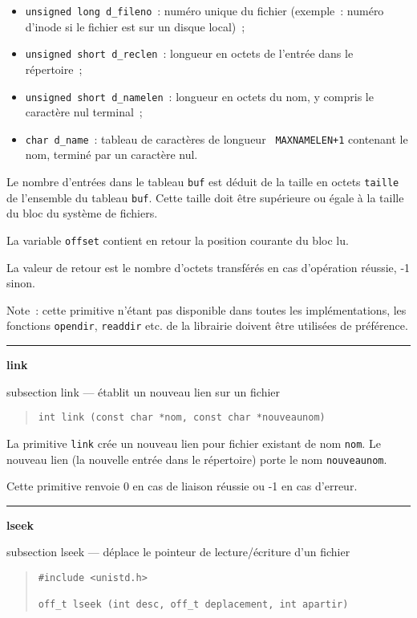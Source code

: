 \documentclass [twoside] {report}
\newcommand {\primitive} [1]
    {
	{\large \bf #1}
	\addcontentsline {toc} {subsection} {#1}
    }
\newcommand {\separation}
    {
	\vspace {7mm}
	\nopagebreak
	\hrule
    }
\begin{document}
\begin {itemize}
    \item {\tt unsigned long d\_fileno}~:  numéro unique du fichier
	(exemple~:  numéro d'inode si le fichier est sur un disque
	local)~;
    \item {\tt unsigned short d\_reclen}~: longueur en octets de l'entrée
	dans le répertoire~;
    \item {\tt unsigned short d\_namelen}~: longueur en octets du nom, y
	compris le caractère nul terminal~;
    \item {\tt char d\_name}~: tableau de caractères de longueur {\tt
	MAXNAMELEN+1} contenant le nom, terminé par un caractère nul.

\end {itemize}

Le nombre d'entrées dans le tableau {\tt buf} est déduit de la taille en
octets {\tt taille} de l'ensemble du tableau {\tt buf}. Cette taille
doit être supérieure ou égale à la taille du bloc du système de
fichiers.

La variable {\tt offset} contient en retour la position courante du bloc
lu.

La valeur de retour est le nombre d'octets transférés en cas d'opération
réussie, -1 sinon.

Note~:  cette primitive n'étant pas disponible dans toutes les
implémentations, les fonctions {\tt opendir}, {\tt readdir} etc.  de la
librairie doivent être utilisées de préférence.


\separation
\primitive {link} --- établit un nouveau lien sur un fichier

\begin {quote}
\begin {verbatim}
int link (const char *nom, const char *nouveaunom)
\end{verbatim}
\end {quote}

La primitive {\tt link} crée un nouveau lien pour
fichier existant de nom {\tt nom}. Le nouveau lien
(la nouvelle entrée dans le répertoire) porte
le nom {\tt nouveaunom}.

Cette primitive renvoie 0 en cas de liaison
réussie ou -1 en cas d'erreur.




\separation
\primitive {lseek} --- déplace le pointeur de lecture/écriture d'un fichier

\begin {quote}
\begin {verbatim}
#include <unistd.h>

off_t lseek (int desc, off_t deplacement, int apartir)
\end{verbatim}
\end {quote}
\end{document}
